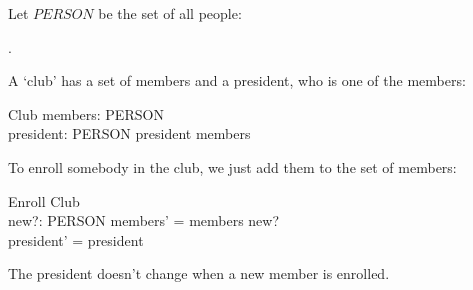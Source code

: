 \documentclass{article}
\begin{document}
\noindent Let $PERSON$ be the set of all people:
\begin{zed}
	[PERSON].
\end{zed}
A `club' has a set of members and a president, who is
one of the members:
\begin{schema}{Club}
	members: \power PERSON \\
	president: PERSON
\where
	president \subseteq members
\end{schema}
To enroll somebody in the club, we just add them
to the set of members:
\begin{schema}{Enroll}
	\Delta Club \\
	new?: PERSON
\where
	members' = members \cup new? \\
	president' = president
\end{schema}
The president doesn't change when a new member
is enrolled.
\end{document}
